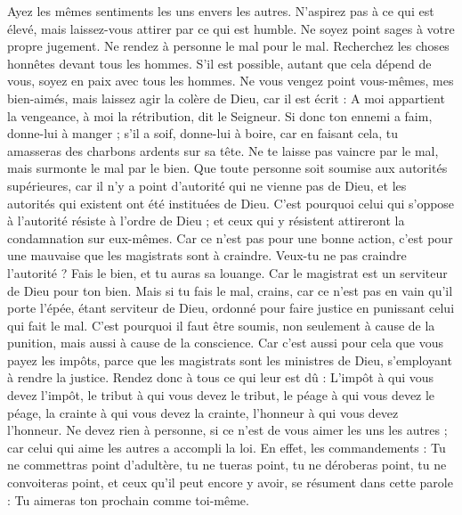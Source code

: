 \begin{multicols}{2}
Ayez les mêmes sentiments les uns envers les autres. N’aspirez pas à ce qui est élevé, mais laissez-vous attirer par ce qui est humble. Ne soyez point sages à votre propre jugement.
Ne rendez à personne le mal pour le mal. Recherchez les choses honnêtes devant tous les hommes.
S’il est possible, autant que cela dépend de vous, soyez en paix avec tous les hommes.
Ne vous vengez point vous-mêmes, mes bien-aimés, mais laissez agir la colère de Dieu, car il est écrit : A moi appartient la vengeance, à moi la rétribution, dit le Seigneur.
Si donc ton ennemi a faim, donne-lui à manger ; s'il a soif, donne-lui à boire, car en faisant cela, tu amasseras des charbons ardents sur sa tête.
Ne te laisse pas vaincre par le mal, mais surmonte le mal par le bien.
\VerseOne{}Que toute personne soit soumise aux autorités supérieures, car il n'y a point d’autorité qui ne vienne pas de Dieu, et les autorités qui existent ont été instituées de Dieu.
C'est pourquoi celui qui s’oppose à l’autorité résiste à l’ordre de Dieu ; et ceux qui y résistent attireront la condamnation sur eux-mêmes.
Car ce n’est pas pour une bonne action, c’est pour une mauvaise que les magistrats sont à craindre. Veux-tu ne pas craindre l’autorité ? Fais le bien, et tu auras sa louange.
Car le magistrat est un serviteur de Dieu pour ton bien. Mais si tu fais le mal, crains, car ce n’est pas en vain qu’il porte l'épée, étant serviteur de Dieu, ordonné pour faire justice en punissant celui qui fait le mal.
C'est pourquoi il faut être soumis, non seulement à cause de la punition, mais aussi à cause de la conscience.
Car c'est aussi pour cela que vous payez les impôts, parce que les magistrats sont les ministres de Dieu, s'employant à rendre la justice.
Rendez donc à tous ce qui leur est dû : L’impôt à qui vous devez l’impôt, le tribut à qui vous devez le tribut, le péage à qui vous devez le péage, la crainte à qui vous devez la crainte, l’honneur à qui vous devez l'honneur.
Ne devez rien à personne, si ce n’est de vous aimer les uns les autres ; car celui qui aime les autres a accompli la loi.
En effet, les commandements : Tu ne commettras point d’adultère, tu ne tueras point, tu ne déroberas point, tu ne convoiteras point, et ceux qu’il peut encore y avoir, se résument dans cette parole : Tu aimeras ton prochain comme toi-même.

\end{multicols}
